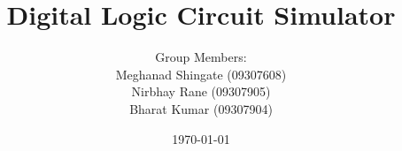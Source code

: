 \title{Digital Logic Circuit Simulator}
\author[Group - 13]{%
Group Members:\\
Meghanad Shingate (09307608)\\
Nirbhay Rane (09307905)\\
Bharat Kumar (09307904)\\
}

\small{ \date[\today]{%
\today \\
}}
